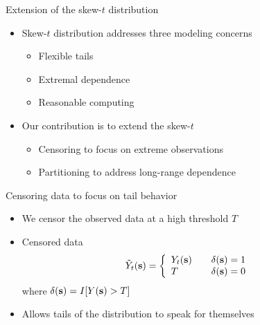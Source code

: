 \documentclass{beamer}
\begin{document}
\begin{frame}{Extension of the skew-$t$ distribution}
  \begin{itemize} \setlength{\itemsep}{1em}
    \item Skew-$t$ distribution addresses three modeling concerns \vspace{0.5em}
    \begin{itemize} \setlength{\itemsep}{0.5em}
      \item Flexible tails
      \item Extremal dependence
      \item Reasonable computing
    \end{itemize}
    \item Our contribution is to extend the skew-$t$ \vspace{0.5em}
    \begin{itemize} \setlength{\itemsep}{0.5em}
      \item Censoring to focus on extreme observations
      \item Partitioning to address long-range dependence
    \end{itemize}
  \end{itemize}
\end{frame}

\begin{frame}{Censoring data to focus on tail behavior}
  \begin{itemize} \setlength{\itemsep}{1em}
    \item We censor the observed data at a high threshold $T$
    \item Censored data
    \begin{align*}
      \tilde{Y}_t(\mbox{\bf s}) = \left\{ \begin{array}{ll}
          Y_t(\mbox{\bf s}) \quad & \delta(\mbox{\bf s}) = 1\\
          T \quad & \delta(\mbox{\bf s}) = 0
      \end{array}\right.
    \end{align*}
    where $\delta(\mbox{\bf s}) = I[Y(\mbox{\bf s}) > T]$
    \item Allows tails of the distribution to speak for themselves
  \end{itemize}
\end{frame}
\end{document}
